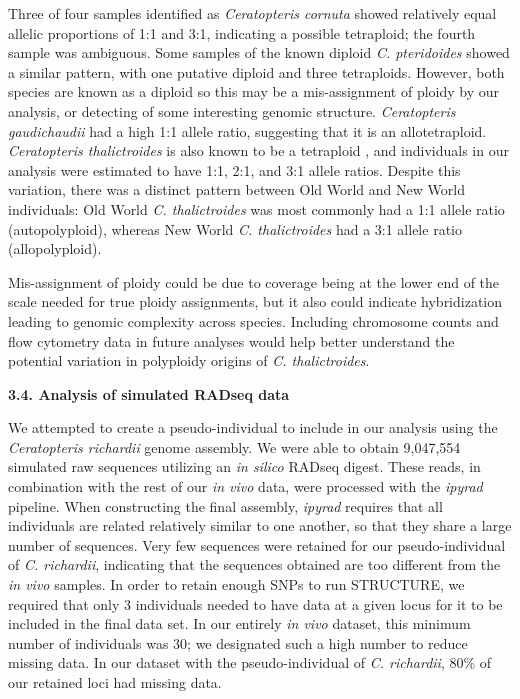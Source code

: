 \documentclass[12pt]{article}
\begin{document}
\begin{flushleft}
Three of four samples identified as \textit{Ceratopteris cornuta} showed relatively equal allelic proportions of 1:1 and 3:1, indicating a possible tetraploid; the fourth sample was ambiguous. Some samples of the known diploid \textit{C. pteridoides} showed a similar pattern, with one putative diploid and three tetraploids. However, both species are known as a diploid so this may be a mis-assignment of ploidy by our analysis, or detecting of some interesting genomic structure. \textit{Ceratopteris gaudichaudii} had a high 1:1 allele ratio, suggesting that it is an allotetraploid. \textit{Ceratopteris thalictroides} is also known to be a tetraploid \autocite{LloydTax1974, Masuyama2010}, and individuals in our analysis were estimated to have 1:1, 2:1, and 3:1 allele ratios. Despite this variation, there was a distinct pattern between Old World and New World individuals: Old World \textit{C. thalictroides} was most commonly had a 1:1 allele ratio (autopolyploid), whereas New World \textit{C. thalictroides} had a 3:1 allele ratio (allopolyploid). 

Mis-assignment of ploidy could be due to coverage being at the lower end of the scale needed for true ploidy assignments, but it also could indicate hybridization leading to genomic complexity across species. Including chromosome counts and flow cytometry data in future analyses would help better understand the potential variation in polyploidy origins of \textit{C. thalictroides}.

\textbf{3.4. Analysis of simulated RADseq data}

We attempted to create a pseudo-individual to include in our analysis using the \textit{Ceratopteris richardii} genome assembly. We were able to obtain 9,047,554 simulated raw sequences utilizing an \textit{in silico} RADseq digest. These reads, in combination with the rest of our \textit{in vivo} data, were processed with the \textit{ipyrad} pipeline. When constructing the final assembly, \textit{ipyrad} requires that all individuals are related relatively similar to one another, so that they share a large number of sequences. Very few sequences were retained for our pseudo-individual of \textit{C. richardii}, indicating that the sequences obtained are too different from the \textit{in vivo} samples. In order to retain enough SNPs to run STRUCTURE, we required that only 3 individuals needed to have data at a given locus for it to be included in the final data set. In our entirely \textit{in vivo} dataset, this minimum number of individuals was 30; we designated such a high number to reduce missing data. In our dataset with the pseudo-individual of \textit{C. richardii}, 80\% of our retained loci had missing data.


\end{flushleft}
\end{document}
